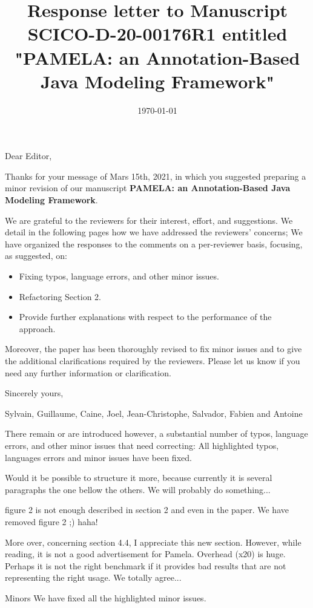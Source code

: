 \documentclass[10pt]{article}
\title{Response letter to Manuscript SCICO-D-20-00176R1 entitled "PAMELA: an Annotation-Based Java Modeling Framework"}
\date{\today}
\begin{document}
Dear Editor,

\bigskip
Thanks for your message of Mars 15th, 2021, in which you suggested preparing a minor revision of our manuscript  \textbf{PAMELA: an Annotation-Based Java Modeling Framework}. 

\bigskip
We are grateful to the reviewers for their interest, effort, and suggestions. We detail in the following pages how we have addressed the reviewers' concerns;  We have organized the responses to the comments on a per-reviewer basis, focusing, as suggested, on: 

\begin{itemize}
\item Fixing typos, language errors, and other minor issues.
\item Refactoring Section 2.
\item Provide further explanations with respect to the performance of the approach.
\end{itemize}

Moreover, the paper has been thoroughly revised to fix minor issues and to give the additional clarifications required by the reviewers. Please let us know if you need any further information or clarification.

\bigskip
Sincerely yours,

\bigskip
Sylvain, Guillaume, Caine, Joel, Jean-Christophe, Salvador, Fabien and Antoine

\pagebreak


\begin{response}{There remain or are introduced however, a substantial number of typos, language errors, and other minor issues that need correcting:} 
All highlighted typos, languages errors and minor issues have been fixed.
\end{response}

\pagebreak

\begin{response}{Would it be possible to structure it more, because currently it is several paragraphs the one bellow the others.}
We will probably do something...
\end{response}


\begin{response}{figure 2 is not enough described in section 2 and even in the paper.}
We have removed figure 2 ;) haha!
\end{response}

\begin{response}{More over, concerning section 4.4, I appreciate this new section. However, while reading, it is not a good advertisement for Pamela. Overhead (x20) is huge. Perhaps it is not the right benchmark if it provides bad results that are not representing the right usage.}
We totally agree...
\end{response}

\begin{response}{Minors}
We have fixed all the highlighted minor issues.
\end{response}
\end{document}

